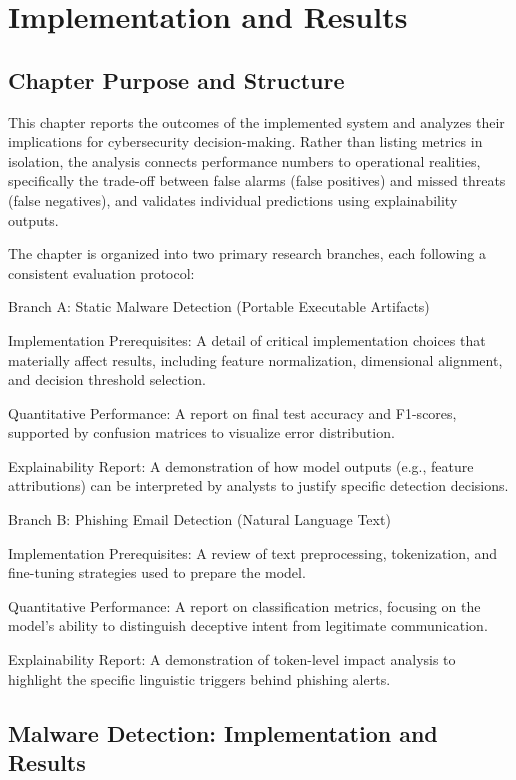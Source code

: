 \documentclass[conference]{IEEEtran}
\begin{document}
\section{Implementation and Results}

\subsection{Chapter Purpose and Structure}

This chapter reports the outcomes of the implemented system and analyzes their implications for cybersecurity decision-making. Rather than listing metrics in isolation, the analysis connects performance numbers to operational realities, specifically the trade-off between false alarms (false positives) and missed threats (false negatives), and validates individual predictions using explainability outputs.

The chapter is organized into two primary research branches, each following a consistent evaluation protocol:

Branch A: Static Malware Detection (Portable Executable Artifacts)

Implementation Prerequisites: A detail of critical implementation choices that materially affect results, including feature normalization, dimensional alignment, and decision threshold selection.

Quantitative Performance: A report on final test accuracy and F1-scores, supported by confusion matrices to visualize error distribution.

Explainability Report: A demonstration of how model outputs (e.g., feature attributions) can be interpreted by analysts to justify specific detection decisions.

Branch B: Phishing Email Detection (Natural Language Text)

Implementation Prerequisites: A review of text preprocessing, tokenization, and fine-tuning strategies used to prepare the model.

Quantitative Performance: A report on classification metrics, focusing on the model's ability to distinguish deceptive intent from legitimate communication.

Explainability Report: A demonstration of token-level impact analysis to highlight the specific linguistic triggers behind phishing alerts.

\subsection{Malware Detection: Implementation and Results}
\end{document}
